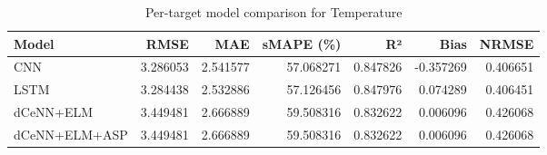 \begin{table}
\caption{Per-target model comparison for Temperature}
\begin{tabular}{lrrrrrr}
\toprule
Model & RMSE & MAE & sMAPE (\%) & R² & Bias & NRMSE \\
\midrule
CNN & 3.286053 & 2.541577 & 57.068271 & 0.847826 & -0.357269 & 0.406651 \\
LSTM & 3.284438 & 2.532886 & 57.126456 & 0.847976 & 0.074289 & 0.406451 \\
dCeNN+ELM & 3.449481 & 2.666889 & 59.508316 & 0.832622 & 0.006096 & 0.426068 \\
dCeNN+ELM+ASP & 3.449481 & 2.666889 & 59.508316 & 0.832622 & 0.006096 & 0.426068 \\
\bottomrule
\end{tabular}
\end{table}
